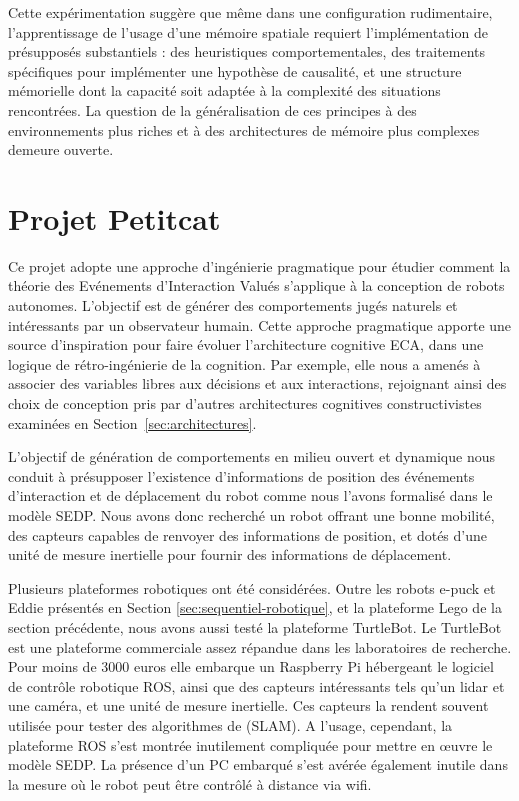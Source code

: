 Cette expérimentation suggère que même dans une configuration rudimentaire, l'apprentissage de l'usage d'une mémoire spatiale requiert l'implémentation de présupposés substantiels : des heuristiques comportementales, des traitements spécifiques pour implémenter une hypothèse de causalité, et une structure mémorielle dont la capacité soit adaptée à la complexité des situations rencontrées.
La question de la généralisation de ces principes à des environnements plus riches et à des architectures de mémoire plus complexes demeure ouverte. 



\section{Projet Petitcat}
\label{sec:petitcat}

\noindent
Ce projet adopte une approche d'ingénierie pragmatique pour étudier comment la théorie des Evénements d'Interaction Valués s'applique à la conception de robots autonomes. 
L'objectif est de générer des comportements jugés naturels et intéressants par un observateur humain. 
Cette approche pragmatique apporte une source d'inspiration pour faire évoluer l'architecture cognitive ECA, dans une logique de rétro-ingénierie de la cognition.
Par exemple, elle nous a amenés à associer des variables libres aux décisions et aux interactions, rejoignant ainsi des choix de conception pris par d'autres architectures cognitives constructivistes examinées en Section~\ref{sec:architectures}.


L'objectif de génération de comportements en milieu ouvert et dynamique nous conduit à présupposer l'existence d'informations de position des événements d'interaction et de déplacement du robot comme nous l'avons formalisé dans le modèle SEDP. 
Nous avons donc recherché un robot offrant une bonne mobilité, des capteurs capables de renvoyer des informations de position, et dotés d'une unité de mesure inertielle pour fournir des informations de déplacement.

Plusieurs plateformes robotiques ont été considérées. 
Outre les robots e-puck et Eddie présentés en Section \ref{sec:sequentiel-robotique}, et la plateforme Lego de la section précédente, nous avons aussi testé la plateforme TurtleBot. 
Le TurtleBot est une plateforme commerciale assez répandue dans les laboratoires de recherche.  
Pour moins de 3000 euros elle embarque un Raspberry Pi hébergeant le logiciel de contrôle robotique ROS, ainsi que des capteurs intéressants tels qu'un lidar et une caméra, et une unité de mesure inertielle. 
Ces capteurs la rendent souvent utilisée pour tester des algorithmes de  (SLAM). 
A l'usage, cependant, la plateforme ROS s'est montrée inutilement compliquée pour mettre en \oe uvre le modèle SEDP. 
La présence d'un PC embarqué s'est avérée également inutile dans la mesure où le robot peut être contrôlé à distance via wifi.

